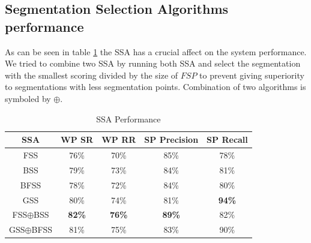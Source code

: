 \documentclass[journal,compsoc]{IEEEtran}
\begin{document}
\subsection{Segmentation Selection Algorithms performance}
\label{subsec:ssa_performance}
As can be seen in table \ref{table:ss_algorithms_results} the SSA has a crucial affect on the system performance. We tried to combine two SSA by running both SSA and select the segmentation with the smallest scoring divided by the size of $FSP$ to prevent giving superiority to segmentations with less segmentation points. Combination of two algorithms is symboled by $\oplus$.

\begin{table}[h]
\caption{SSA Performance}
\begin{tabular}{ | c | c | c | c | c |}
\hline
SSA & WP SR & WP RR & SP Precision & SP Recall\\
\hline                 
  FSS & 76\% & 70\% & 85\% & 78\% \\ 
  \hline
  BSS & 79\% &  73\% & 84\%& 81\% \\
  \hline
  BFSS & 78\% & 72\% & 84\% & 80\%\\ 
  \hline
  GSS & 80\% & 74\% & 81\% & \bf{94}\% \\  
  \hline
  FSS$\oplus$BSS & \bf{82}\% & \bf{76}\% & \bf{89}\% & 82\%\\  
  \hline
  GSS$\oplus$BFSS & 81\% & 75\% & 83\% & 90\% \\
  \hline
\end{tabular}
\centering
\label{table:ss_algorithms_results} 
\end{table}


\end{document}

